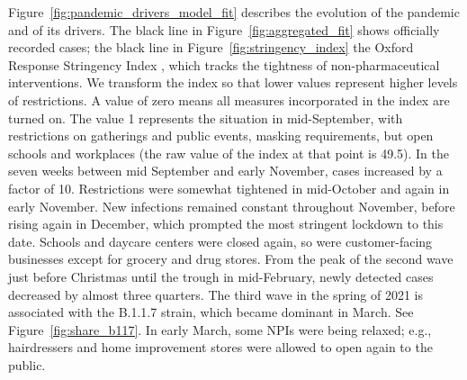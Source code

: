 Figure~\ref{fig:pandemic_drivers_model_fit} describes the evolution of the
pandemic and of its drivers. The black line in Figure~\ref{fig:aggregated_fit}
shows officially recorded cases; the black line in
Figure~\ref{fig:stringency_index} the Oxford Response Stringency Index
\citep{Hale2020}, which tracks the tightness of non-pharmaceutical
interventions. We transform the index so that lower values represent higher
levels of restrictions. A value of zero means all measures incorporated in the
index are turned on. The value 1 represents the situation in mid-September, with
restrictions on gatherings and public events, masking requirements, but open
schools and workplaces (the raw value of the index at that point is 49.5). In
the seven weeks between mid September and early November, cases increased by a
factor of 10. Restrictions were somewhat tightened in mid-October and again in
early November. New infections remained constant throughout November, before
rising again in December, which prompted the most stringent lockdown to this
date. Schools and daycare centers were closed again, so were customer-facing
businesses except for grocery and drug stores. From the peak of the second wave
just before Christmas until the trough in mid-February, newly detected cases
decreased by almost three quarters. The third wave in the spring of 2021 is
associated with the B.1.1.7 strain, which became dominant in March. See
Figure~\ref{fig:share_b117}. In early March, some NPIs were being relaxed; e.g.,
hairdressers and home improvement stores were allowed to open again to the
public.


